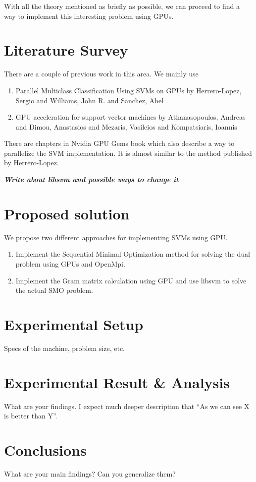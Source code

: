 \documentclass{article}
\begin{document}
With all the theory mentioned as briefly as possible, we can proceed to find a way to implement this interesting problem using GPUs.

\section{Literature Survey}
There are a couple of previous work in this area.  We mainly use
\begin{enumerate}
    \item Parallel Multiclass Classification Using SVMs on GPUs by Herrero-Lopez, Sergio and Williams, John R. and Sanchez, Abel~\cite{Herrero-Lopez:2010:PMC:1735688.1735692}.
    \item GPU acceleration for support vector machines by Athanasopoulos, Andreas and Dimou, Anastasios and Mezaris, Vasileios and Kompatsiaris, Ioannis~\cite{athanasopoulos2011gpu}
\end{enumerate}

There are chapters in Nvidia GPU Gems book which also describe a way to parallelize the SVM implementation.  It is almost similar to the method published by Herrero-Lopez.


\textit{\textbf{Write about libsvm and possible ways to change it}}

\section{Proposed solution}
We propose two different approaches for implementing SVMs using GPU\@.

\begin{enumerate}
\item Implement the Sequential Minimal Optimization method for solving the dual problem using GPUs and OpenMpi.
\item Implement the Gram matrix calculation using GPU and use libsvm to solve the actual SMO problem.
\end{enumerate}

\section{Experimental Setup}
Specs of the machine, problem size, etc.
\section{Experimental Result \& Analysis}
What are your findings. I expect much deeper description that ``As we can see X is better than Y''.
\section{Conclusions}
What are your main findings? Can you generalize them?



\end{document}
